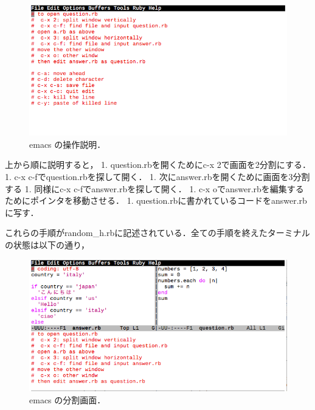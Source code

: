 \documentclass[11pt,dvipdfmx]{jsarticle}
\begin{document}
\begin{figure}[H]
\centering
\begin{center}
\includegraphics[width=150mm]{../../picture/random_h.png}
\end{center}
\caption{emacs の操作説明．\label{random_h}}

\label{fig:}
\end{figure}

上から順に説明すると， 1. question.rbを開くためにc-x
2で画面を2分割にする． 1. c-x c-fでquestion.rbを探して開く． 1.
次にanswer.rbを開くために画面を3分割する 1. 同様にc-x
c-fでanswer.rbを探して開く． 1. c-x
oでanswer.rbを編集するためにポインタを移動させる． 1.
question.rbに書かれているコードをanswer.rbに写す．

これらの手順がrandom\_h.rbに記述されている．全ての手順を終えたターミナルの状態は以下の通り，

\begin{figure}[H]
\centering
\begin{center}
\includegraphics[width=150mm]{../../picture/split.png}
\end{center}
\caption{emacs の分割画面．\label{split}}

\label{fig:}
\end{figure}
\end{document}
